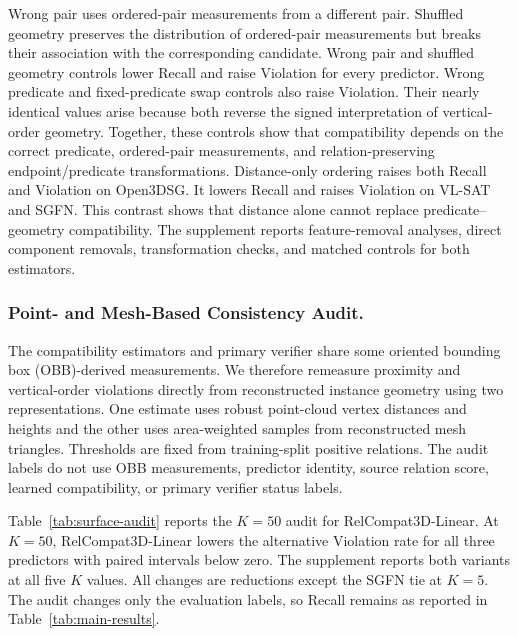 Wrong pair uses ordered-pair measurements from a different pair. Shuffled geometry preserves the distribution of ordered-pair measurements but breaks their association with the corresponding candidate. Wrong pair and shuffled geometry controls lower Recall and raise Violation for every predictor. Wrong predicate and fixed-predicate swap controls also raise Violation. Their nearly identical values arise because both reverse the signed interpretation of vertical-order geometry. Together, these controls show that compatibility depends on the correct predicate, ordered-pair measurements, and relation-preserving endpoint/predicate transformations. Distance-only ordering raises both Recall and Violation on Open3DSG. It lowers Recall and raises Violation on VL-SAT and SGFN. This contrast shows that distance alone cannot replace predicate--geometry compatibility. The supplement reports feature-removal analyses, direct component removals, transformation checks, and matched controls for both estimators.

\subsubsection{Point- and Mesh-Based Consistency Audit.}
The compatibility estimators and primary verifier share some oriented bounding box (OBB)-derived measurements. We therefore remeasure proximity and vertical-order violations directly from reconstructed instance geometry using two representations. One estimate uses robust point-cloud vertex distances and heights and the other uses area-weighted samples from reconstructed mesh triangles. Thresholds are fixed from training-split positive relations. The audit labels do not use OBB measurements, predictor identity, source relation score, learned compatibility, or primary verifier status labels.

Table~\ref{tab:surface-audit} reports the $K=50$ audit for RelCompat3D-Linear. At $K=50$, RelCompat3D-Linear lowers the alternative Violation rate for all three predictors with paired intervals below zero. The supplement reports both variants at all five $K$ values. All changes are reductions except the SGFN tie at $K=5$. The audit changes only the evaluation labels, so Recall remains as reported in Table~\ref{tab:main-results}.
